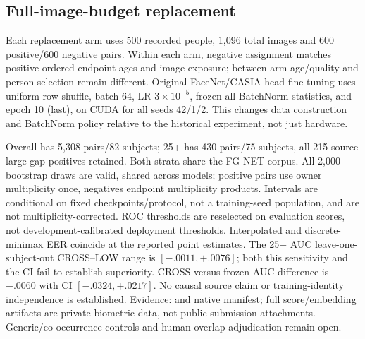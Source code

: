 \documentclass[journal]{IEEEtran}
\begin{document}
\subsection{Full-image-budget replacement}
Each replacement arm uses 500 recorded people, 1{,}096 total images and 600
positive/600 negative pairs. Within each arm, negative assignment matches
positive ordered endpoint ages and image exposure; between-arm age/quality and
person selection remain different. Original FaceNet/CASIA head fine-tuning uses
uniform row shuffle, batch 64, LR $3\times10^{-5}$, frozen-all BatchNorm statistics,
and epoch 10 (last), on CUDA for all seeds 42/1/2. This changes data construction
and BatchNorm policy relative to the historical experiment, not just hardware.

\begin{table}[!t]
\caption{Replacement CUDA LOW/CROSS control. Means across three checkpoints; paired subject-bootstrap 95\% CI for CROSS minus LOW, not an ensemble AUC. Smaller EER is better.}
\label{tab:oriented-source}
\centering\footnotesize
{}
\end{table}
Overall has 5{,}308 pairs/82 subjects; 25+ has 430 pairs/75 subjects, all
215 source large-gap positives retained. Both strata share the FG-NET corpus.
All 2{,}000 bootstrap draws are valid, shared across models; positive pairs use
owner multiplicity once, negatives endpoint multiplicity products. Intervals are
conditional on fixed checkpoints/protocol, not a training-seed population, and
are not multiplicity-corrected. ROC thresholds are reselected on evaluation
scores, not development-calibrated deployment thresholds. Interpolated and
discrete-minimax EER coincide at the reported point estimates.
The 25+ AUC leave-one-subject-out CROSS--LOW range is $[-.0011,+.0076]$;
both this sensitivity and the CI fail to establish superiority. CROSS versus
frozen AUC difference is $-.0060$ with CI $[-.0324,+.0217]$.
No causal source claim or training-identity independence is established.
Evidence:  and native
manifest; full score/embedding artifacts are private biometric data, not public
submission attachments. Generic/co-occurrence controls and human overlap
adjudication remain open.
\end{document}
